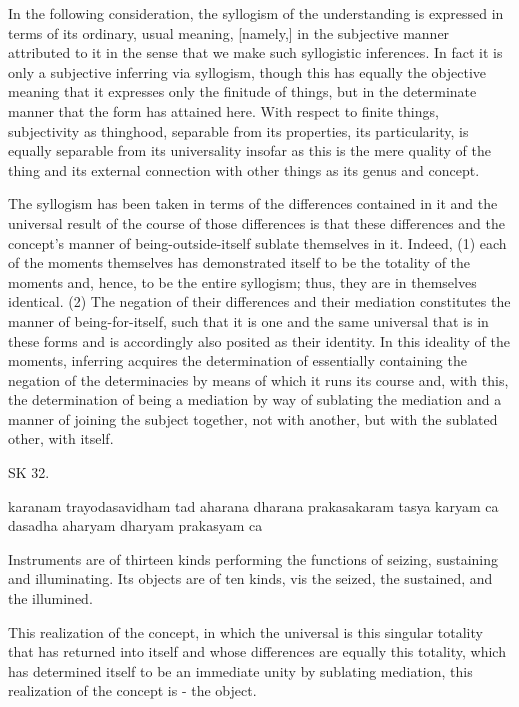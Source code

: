     In the following consideration, the syllogism of the understanding
    is expressed in terms of its ordinary, usual meaning, [namely,] in
    the subjective manner attributed to it in the sense that
    we make such syllogistic inferences.
    In fact it is only a subjective inferring via syllogism,
    though this has equally the objective meaning that
    it expresses only the finitude of things,
    but in the determinate manner that the form has attained here.
    With respect to finite things, subjectivity as thinghood,
    separable from its properties, its particularity, is
    equally separable from its universality insofar as this is
    the mere quality of the thing and its external connection with
    other things as its genus and concept.

The syllogism has been taken in terms of the differences contained in it
and the universal result of the course of those differences is that
these differences and the concept's manner of being-outside-itself
sublate themselves in it.
Indeed,
(1) each of the moments themselves has demonstrated itself to be
the totality of the moments and, hence, to be the entire syllogism;
thus, they are in themselves identical.
(2) The negation of their differences and their mediation constitutes the
manner of being-for-itself, such that it is one and the same universal
that is in these forms and is accordingly also posited as their identity.
In this ideality of the moments, inferring acquires the determination
of essentially containing the negation of the determinacies
by means of which it runs its course and, with this,
the determination of being a mediation by way of sublating the mediation
and a manner of joining the subject together, not with another,
but with the sublated other, with itself.

SK 32.

karanam trayodasavidham tad aharana dharana prakasakaram
tasya karyam ca dasadha aharyam dharyam prakasyam ca

Instruments are of thirteen kinds performing the functions of
seizing, sustaining and illuminating.
Its objects are of ten kinds, vis
the seized, the sustained, and the illumined.

This realization of the concept, in which the universal is
this singular totality that has returned into itself
and whose differences are equally this totality,
which has determined itself to be an immediate unity by sublating mediation,
this realization of the concept is - the object.

